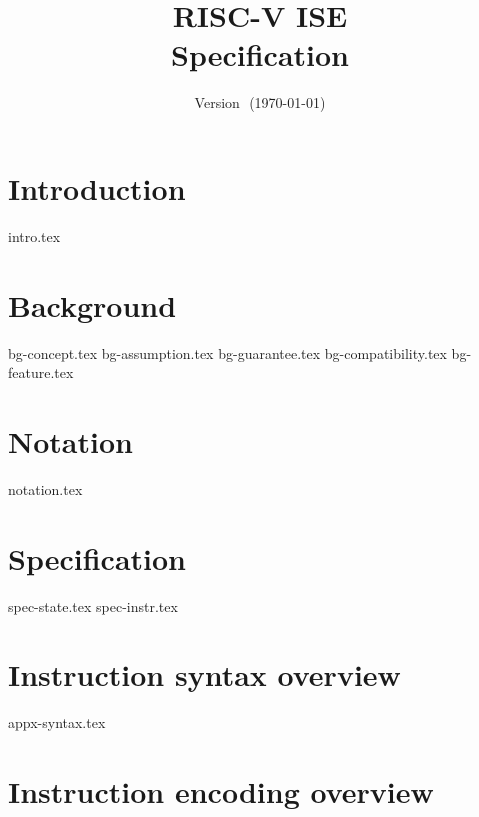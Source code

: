 \documentclass{article}
\title{RISC-V \XCID ISE \\ Specification}
\author{}
\date{Version $$ (\today)}
\begin{document}
\maketitle \tableofcontents


\section{Introduction}
\label{sec:intro}

{intro.tex}

\section{Background}
\label{sec:bg}

{bg-concept.tex}
{bg-assumption.tex}
{bg-guarantee.tex}
{bg-compatibility.tex}
{bg-feature.tex}

\section{Notation}
\label{sec:notation}

{notation.tex}

\section{Specification}
\label{sec:spec}

{spec-state.tex}
{spec-instr.tex}


\newpage
\printbibliography


\appendix

\newpage
\section{Instruction syntax   overview}
\label{appx:syntax}

{appx-syntax.tex}

\newpage
\section{Instruction encoding overview} 
\label{appx:encoding}
\end{document}

